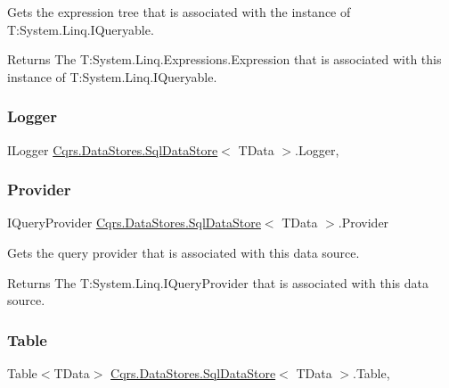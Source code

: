 Gets the expression tree that is associated with the instance of T\+:\+System.\+Linq.\+I\+Queryable. 

\begin{DoxyReturn}{Returns}
The T\+:\+System.\+Linq.\+Expressions.\+Expression that is associated with this instance of T\+:\+System.\+Linq.\+I\+Queryable. 
\end{DoxyReturn}
\mbox{\label{classCqrs_1_1DataStores_1_1SqlDataStore_a44cd63b587e42b278177070eab8404f7_a44cd63b587e42b278177070eab8404f7}} 
\subsubsection{\texorpdfstring{Logger}{Logger}}
{\footnotesize\ttfamily I\+Logger \hyperlink{classCqrs_1_1DataStores_1_1SqlDataStore}{Cqrs.\+Data\+Stores.\+Sql\+Data\+Store}$<$ T\+Data $>$.Logger\hspace{0.3cm}{\ttfamily [get]}, {\ttfamily [protected]}}

\mbox{\label{classCqrs_1_1DataStores_1_1SqlDataStore_aec0093c6fe2adc41899c2418a0e324d9_aec0093c6fe2adc41899c2418a0e324d9}} 
\subsubsection{\texorpdfstring{Provider}{Provider}}
{\footnotesize\ttfamily I\+Query\+Provider \hyperlink{classCqrs_1_1DataStores_1_1SqlDataStore}{Cqrs.\+Data\+Stores.\+Sql\+Data\+Store}$<$ T\+Data $>$.Provider\hspace{0.3cm}{\ttfamily [get]}}



Gets the query provider that is associated with this data source. 

\begin{DoxyReturn}{Returns}
The T\+:\+System.\+Linq.\+I\+Query\+Provider that is associated with this data source. 
\end{DoxyReturn}
\mbox{\label{classCqrs_1_1DataStores_1_1SqlDataStore_abcd0a88f984a275880f402baadaae2c7_abcd0a88f984a275880f402baadaae2c7}} 
\subsubsection{\texorpdfstring{Table}{Table}}
{\footnotesize\ttfamily Table$<$T\+Data$>$ \hyperlink{classCqrs_1_1DataStores_1_1SqlDataStore}{Cqrs.\+Data\+Stores.\+Sql\+Data\+Store}$<$ T\+Data $>$.Table\hspace{0.3cm}{\ttfamily [get]}, {\ttfamily [protected]}}

